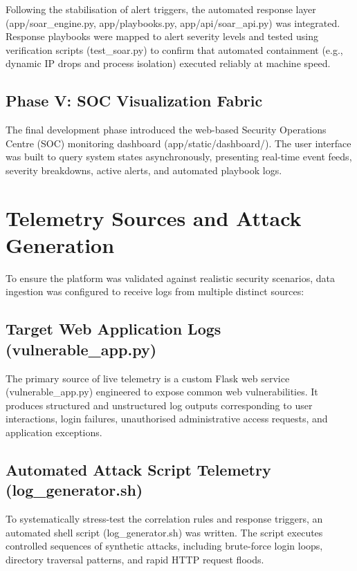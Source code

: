 Following the stabilisation of alert triggers, the automated response layer (app/soar\_engine.py, app/playbooks.py, app/api/soar\_api.py) was integrated. Response playbooks were mapped to alert severity levels and tested using verification scripts (test\_soar.py) to confirm that automated containment (e.g., dynamic IP drops and process isolation) executed reliably at machine speed.

\subsection{Phase V: SOC Visualization Fabric}

The final development phase introduced the web-based Security Operations Centre (SOC) monitoring dashboard (app/static/dashboard/). The user interface was built to query system states asynchronously, presenting real-time event feeds, severity breakdowns, active alerts, and automated playbook logs.

\section{Telemetry Sources and Attack Generation}

To ensure the platform was validated against realistic security scenarios, data ingestion was configured to receive logs from multiple distinct sources:

\subsection{Target Web Application Logs (vulnerable\_app.py)}

The primary source of live telemetry is a custom Flask web service (vulnerable\_app.py) engineered to expose common web vulnerabilities. It produces structured and unstructured log outputs corresponding to user interactions, login failures, unauthorised administrative access requests, and application exceptions.

\subsection{Automated Attack Script Telemetry (log\_generator.sh)}

To systematically stress-test the correlation rules and response triggers, an automated shell script (log\_generator.sh) was written. The script executes controlled sequences of synthetic attacks, including brute-force login loops, directory traversal patterns, and rapid HTTP request floods.

